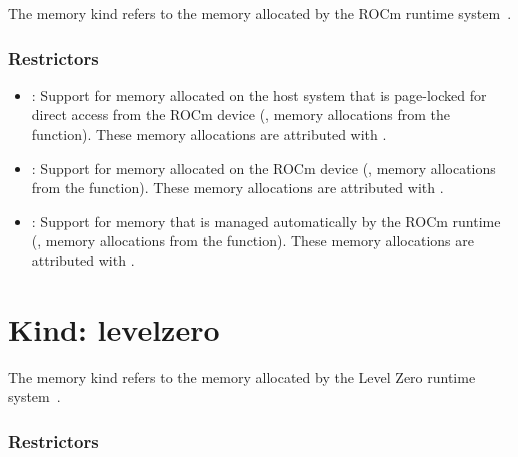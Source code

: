 The  memory kind refers to the memory allocated by the ROCm
runtime system~\cite{rocmref}.

\subsubsection{Restrictors}

\begin{itemize}

\item {}: Support for memory allocated on the host system that
    is page-locked for direct access from the ROCm device (\eg, memory
        allocations from the  function).
        These memory allocations are attributed with .

\item {}: Support for memory allocated on the ROCm device
    (\eg, memory allocations from the  function).
        These memory allocations are attributed with .

\item {}: Support for memory that is managed automatically
    by the ROCm runtime (\eg, memory allocations from the
         function).
        These memory allocations are attributed with .

\end{itemize}

\section{Kind: levelzero}

The  memory kind refers to the memory allocated by the
Level Zero runtime system~\cite{zeref}.

\subsubsection{Restrictors}

